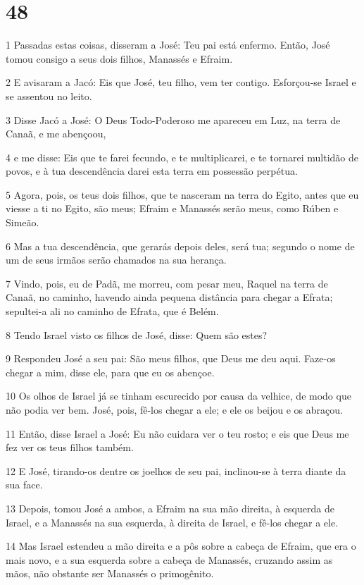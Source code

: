 \chapter{48}

\par 1 Passadas estas coisas, disseram a José: Teu pai está enfermo. Então, José tomou consigo a seus dois filhos, Manassés e Efraim.
\par 2 E avisaram a Jacó: Eis que José, teu filho, vem ter contigo. Esforçou-se Israel e se assentou no leito.
\par 3 Disse Jacó a José: O Deus Todo-Poderoso me apareceu em Luz, na terra de Canaã, e me abençoou,
\par 4 e me disse: Eis que te farei fecundo, e te multiplicarei, e te tornarei multidão de povos, e à tua descendência darei esta terra em possessão perpétua.
\par 5 Agora, pois, os teus dois filhos, que te nasceram na terra do Egito, antes que eu viesse a ti no Egito, são meus; Efraim e Manassés serão meus, como Rúben e Simeão.
\par 6 Mas a tua descendência, que gerarás depois deles, será tua; segundo o nome de um de seus irmãos serão chamados na sua herança.
\par 7 Vindo, pois, eu de Padã, me morreu, com pesar meu, Raquel na terra de Canaã, no caminho, havendo ainda pequena distância para chegar a Efrata; sepultei-a ali no caminho de Efrata, que é Belém.
\par 8 Tendo Israel visto os filhos de José, disse: Quem são estes?
\par 9 Respondeu José a seu pai: São meus filhos, que Deus me deu aqui. Faze-os chegar a mim, disse ele, para que eu os abençoe.
\par 10 Os olhos de Israel já se tinham escurecido por causa da velhice, de modo que não podia ver bem. José, pois, fê-los chegar a ele; e ele os beijou e os abraçou.
\par 11 Então, disse Israel a José: Eu não cuidara ver o teu rosto; e eis que Deus me fez ver os teus filhos também.
\par 12 E José, tirando-os dentre os joelhos de seu pai, inclinou-se à terra diante da sua face.
\par 13 Depois, tomou José a ambos, a Efraim na sua mão direita, à esquerda de Israel, e a Manassés na sua esquerda, à direita de Israel, e fê-los chegar a ele.
\par 14 Mas Israel estendeu a mão direita e a pôs sobre a cabeça de Efraim, que era o mais novo, e a sua esquerda sobre a cabeça de Manassés, cruzando assim as mãos, não obstante ser Manassés o primogênito.
